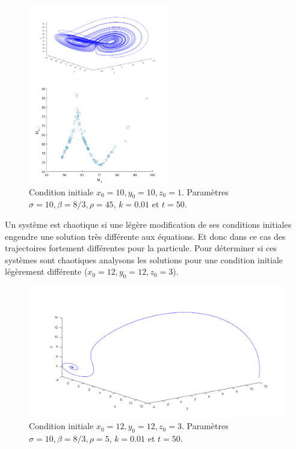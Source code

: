 \documentclass[a4paper, 12pt]{report}
\begin{document}
\begin{figure}[H]
    \centering
    \begin{minipage}[t]{6cm}
        \centering
        \includegraphics[width=6cm]{images/lorenz45.png}
    \end{minipage}\hspace{1cm}
    \begin{minipage}[t]{6cm}
        \centering
        \includegraphics[width=6cm]{images/lorenz_m_45.png}
    \end{minipage}
    \caption{Condition initiale $x_0 = 10, y_0 = 10, z_0=1$. Paramètres $\sigma=10, \beta=8/3, \rho=45$, $k=0.01$ et $t=50$.}
\end{figure}

Un système est chaotique si une légère modification de ses conditions
initiales engendre une solution très différente aux équations. Et donc
dans ce cas des trajectoires fortement différentes pour la particule.
Pour déterminer si ces systèmes sont chaotiques analysons les solutions
pour une condition initiale légèrement différente ($x_0 = 12, y_0 = 12, z_0=3$).

\begin{figure}[H]
  \centering
  \includegraphics[scale=0.7]{images/lorenz_condin2_5.png}
  \caption{Condition initiale $x_0 = 12, y_0 = 12, z_0=3$. Paramètres $\sigma=10, \beta=8/3, \rho=5$, $k=0.01$ et $t=50$.}
\end{figure}
\end{document}
